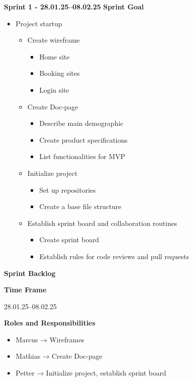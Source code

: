 \documentclass{article}
\begin{document}
\textbf{Sprint 1 - 28.01.25–08.02.25} 
\textbf{Sprint Goal} 

\begin{itemize}
    \item Project startup
    \begin{itemize}
        \item Create wireframe
        \begin{itemize}
            \item Home site
            \item Booking sites
            \item Login site
        \end{itemize}
        \item Create Doc-page
        \begin{itemize}
            \item Describe main demographic
            \item Create product specifications
            \item List functionalities for MVP
        \end{itemize}
        \item Initialize project
        \begin{itemize}
            \item Set up repositories
            \item Create a base file structure
        \end{itemize}
        \item Establish sprint board and collaboration routines
        \begin{itemize}
            \item Create sprint board
            \item Establish rules for code reviews and pull requests
        \end{itemize}
    \end{itemize}
\end{itemize}

\textbf{Sprint Backlog} 

\textbf{Time Frame} 

28.01.25–08.02.25 

\textbf{Roles and Responsibilities} 

\begin{itemize}
    \item Marcus → Wireframes
    \item Mathias → Create Doc-page
    \item Petter → Initialize project, establish sprint board
\end{itemize}
\end{document}
